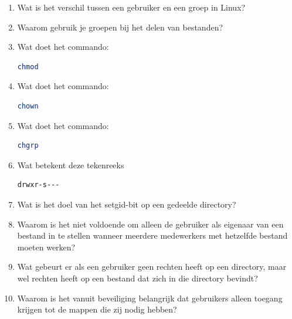 \begin{enumerate}
\item Wat is het verschil tussen een gebruiker en een groep in Linux?
\item Waarom gebruik je groepen bij het delen van bestanden?
\item Wat doet het commando:
\begin{lstlisting}[language=bash]
chmod
\end{lstlisting}
\item Wat doet het commando:
\begin{lstlisting}[language=bash]
chown
\end{lstlisting}
\item Wat doet het commando:
\begin{lstlisting}[language=bash]
chgrp
\end{lstlisting}
\item Wat betekent deze tekenreeks
\begin{lstlisting}[language=bash]
drwxr-s---
\end{lstlisting}
\item Wat is het doel van het setgid-bit op een gedeelde directory?
\item Waarom is het niet voldoende om alleen de gebruiker als eigenaar van een bestand in te stellen wanneer meerdere medewerkers met hetzelfde bestand moeten werken?
\item Wat gebeurt er als een gebruiker geen rechten heeft op een directory, maar wel rechten heeft op een bestand dat zich in die directory bevindt?
\item Waarom is het vanuit beveiliging belangrijk dat gebruikers alleen toegang krijgen tot de mappen die zij nodig hebben?
\end{enumerate}

